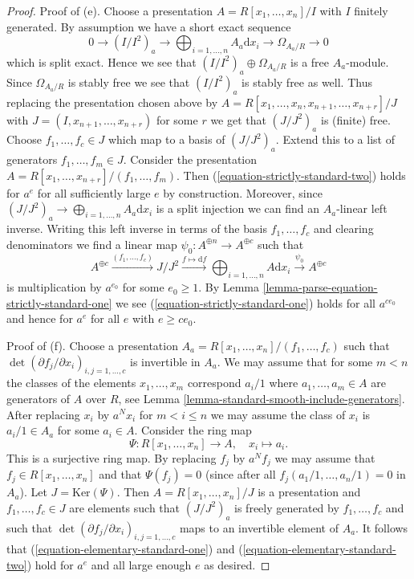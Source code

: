 \begin{proof}
\medskip\noindent
Proof of (e). Choose a presentation
$A = R[x_1, \ldots, x_n]/I$ with $I$ finitely generated.
By assumption we have a short exact sequence
$$
0 \to (I/I^2)_a \to \bigoplus\nolimits_{i = 1, \ldots, n} A_a\text{d}x_i \to
\Omega_{A_a/R} \to 0
$$
which is split exact. Hence we see that
$(I/I^2)_a \oplus \Omega_{A_a/R}$ is a free $A_a$-module.
Since $\Omega_{A_a/R}$ is stably free we see that $(I/I^2)_a$
is stably free as well. Thus replacing the presentation chosen
above by $A = R[x_1, \ldots, x_n, x_{n + 1}, \ldots, x_{n + r}]/J$ with
$J = (I, x_{n + 1}, \ldots, x_{n + r})$ for some $r$ we get that $(J/J^2)_a$
is (finite) free. Choose $f_1, \ldots, f_c \in J$ which map to a basis of
$(J/J^2)_a$. Extend this to a list of generators
$f_1, \ldots, f_m \in J$. Consider the presentation
$A = R[x_1, \ldots, x_{n + r}]/(f_1, \ldots, f_m)$.
Then (\ref{equation-strictly-standard-two}) holds for $a^e$
for all sufficiently large $e$ by construction. Moreover, since
$(J/J^2)_a \to \bigoplus\nolimits_{i = 1, \ldots, n} A_a\text{d}x_i$
is a split injection we can find an $A_a$-linear left inverse.
Writing this left inverse in terms of the basis $f_1, \ldots, f_c$
and clearing denominators we find a linear map
$\psi_0 : A^{\oplus n} \to A^{\oplus c}$ such that
$$
A^{\oplus c} \xrightarrow{(f_1, \ldots, f_c)}
J/J^2 \xrightarrow{f \mapsto \text{d}f}
\bigoplus\nolimits_{i = 1, \ldots, n} A \text{d}x_i
\xrightarrow{\psi_0}
A^{\oplus c}
$$
is multiplication by $a^{e_0}$ for some $e_0 \geq 1$. By
Lemma \ref{lemma-parse-equation-strictly-standard-one}
we see (\ref{equation-strictly-standard-one})
holds for all $a^{ce_0}$ and hence for $a^e$ for all $e$ with $e \geq ce_0$.

\medskip\noindent
Proof of (f). Choose a presentation
$A_a = R[x_1, \ldots, x_n]/(f_1, \ldots, f_c)$ such that
$\det(\partial f_j/\partial x_i)_{i, j = 1, \ldots, c}$
is invertible in $A_a$. We may assume that for some
$m < n$ the classes of the elements $x_1, \ldots, x_m$
correspond $a_i/1$ where $a_1, \ldots, a_m \in A$ are generators of $A$
over $R$, see Lemma \ref{lemma-standard-smooth-include-generators}.
After replacing $x_i$ by $a^Nx_i$ for $m < i \leq n$
we may assume the class of $x_i$ is $a_i/1 \in A_a$ for some
$a_i \in A$. Consider the ring map
$$
\Psi : R[x_1, \ldots, x_n] \longrightarrow A,\quad
x_i \longmapsto a_i.
$$
This is a surjective ring map. By replacing $f_j$ by $a^Nf_j$ we may
assume that $f_j \in R[x_1, \ldots, x_n]$ and that
$\Psi(f_j) = 0$ (since after all $f_j(a_1/1, \ldots, a_n/1) = 0$
in $A_a$). Let $J = \text{Ker}(\Psi)$. Then $A = R[x_1, \ldots, x_n]/J$
is a presentation and $f_1, \ldots, f_c \in J$ are elements such that
$(J/J^2)_a$ is freely generated by $f_1, \ldots, f_c$ and such
that $\det(\partial f_j/\partial x_i)_{i, j = 1, \ldots, c}$
maps to an invertible element of $A_a$. It follows that
(\ref{equation-elementary-standard-one}) and
(\ref{equation-elementary-standard-two})
hold for $a^e$ and all large enough $e$ as desired.
\end{proof}



